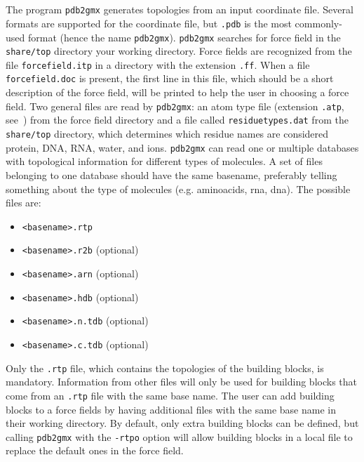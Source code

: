 \section{}
\label{sec:pdb2gmxfiles}
The {\gromacs} program {\tt pdb2gmx} generates topologies from
an input coordinate file. Several formats are supported for
the coordinate file, but {\tt *.pdb} is the most commonly-used format
(hence the name {\tt pdb2gmx}).
{\tt pdb2gmx} searches for force field in the {\gromacs} {\tt share/top}
directory your working directory. Force fields are recognized from
the file {\tt forcefield.itp} in a directory with the extension {\tt .ff}.
When a file {\tt forcefield.doc} is present, the first line in this file,
which should be a short description of the force field, will be printed to
help the user in choosing a force field.
Two general files are read by {\tt pdb2gmx}: an atom type file
(extension {\tt .atp}, see~) from the force field directory
and a file called {\tt residuetypes.dat} from the {\gromacs} {\tt share/top}
directory, which determines which residue names are considered protein, DNA, RNA,
water, and ions.
{\tt pdb2gmx} can read one or multiple databases with topological information
for different types of molecules. A set of files belonging to one database
should have the same basename, preferably telling something about the type
of molecules (e.g. aminoacids, rna, dna). The possible files are:
\begin{itemize}
\item {\tt <basename>.rtp}
\item {\tt <basename>.r2b} (optional)
\item {\tt <basename>.arn} (optional)
\item {\tt <basename>.hdb} (optional)
\item {\tt <basename>.n.tdb} (optional)
\item {\tt <basename>.c.tdb} (optional)
\end{itemize}
Only the {\tt .rtp} file, which contains the topologies of the building
blocks, is mandatory. Information from other files will only be used 
for building blocks that come from an {\tt .rtp} file with the same base name.
The user can add building blocks to a force fields by having additional
files with the same base name in their working directory. By default, only
extra building blocks can be defined, but calling {\tt pdb2gmx} with
the {\tt -rtpo} option will allow building blocks in a local file
to replace the default ones in the force field.


